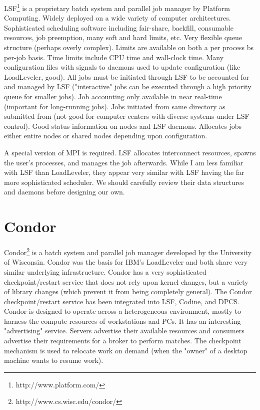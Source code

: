 \documentclass{article}
\begin{document}
LSF\footnote{http://www.platform.com/}
is a proprietary batch system and parallel job manager by 
Platform Computing. Widely deployed on a wide variety of computer 
architectures. Sophisticated scheduling software including 
fair-share, backfill, consumable resources, job preemption, many soft 
and hard limits, etc. Very flexible queue structure (perhaps overly 
complex). Limits are available on both a per process bs per-job  
basis. Time limits include CPU time and wall-clock time. Many 
configuration files with signals to daemons used to update 
configuration (like LoadLeveler, good). All jobs must be initiated 
through LSF to be accounted for and managed by LSF ("interactive" 
jobs can be executed through a high priority queue for 
smaller jobs). Job accounting only available in near real-time (important 
for long-running jobs). Jobs initiated from same directory as 
submitted from (not good for computer centers with diverse systems 
under LSF control). Good status information on nodes and LSF daemons. 
Allocates jobs either entire nodes or shared nodes depending upon 
configuration.

A special version of MPI is required. LSF allocates interconnect 
resources, spawns the user's processes, and manages the job 
afterwards. While I am less familiar with LSF than LoadLeveler, they 
appear very similar with LSF having the far more sophisticated 
scheduler. We should carefully review their data structures and 
daemons before designing our own.


\section{Condor}


Condor\footnote{http://www.cs.wisc.edu/condor/} is a
batch system and parallel job manager 
developed by the University of Wisconsin. 
Condor was the basis for IBM's LoadLeveler and both share very similar 
underlying infrastructure. Condor has a very sophisticated checkpoint/restart 
service that does not rely upon kernel changes, but a variety of 
library changes (which prevent it from being completely general). The 
Condor checkpoint/restart service has been integrated into LSF, 
Codine, and DPCS. Condor is designed to operate across a 
heterogeneous environment, mostly to harness the compute resources of 
workstations and PCs. It has an interesting "advertising" service. 
Servers advertise their available resources and consumers advertise 
their requirements for a broker to perform matches. The checkpoint 
mechanism is used to relocate work on demand (when the "owner" of a 
desktop machine wants to resume work).
\end{document}
